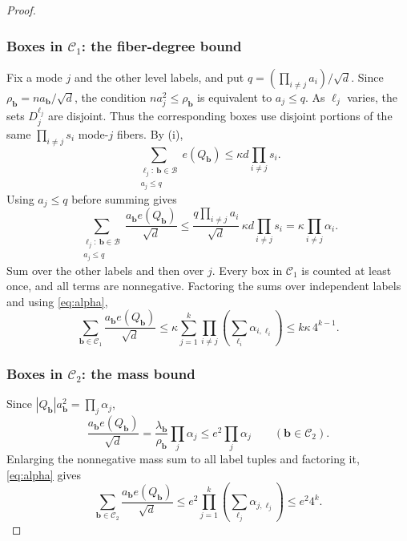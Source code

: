 \documentclass[11pt,reqno]{amsart}
\numberwithin{equation}{section}
\theoremstyle{definition}
\theoremstyle{remark}
\begin{document}
\begin{proof}
\subsubsection*{Boxes in $\mathcal C_1$: the fiber-degree bound}
Fix a mode $j$ and the other level labels, and put
$q=(\prod_{i\ne j}a_i)/\sqrt d$. Since
$\rho_{\mathbf b}=na_{\mathbf b}/\sqrt d$, the condition
$na_j^2\le\rho_{\mathbf b}$ is equivalent to $a_j\le q$.
As $\ell_j$ varies, the sets $D_j^{\ell_j}$ are disjoint.
Thus the corresponding boxes use disjoint portions of the same
$\prod_{i\ne j}s_i$ mode-$j$ fibers. By \textup{(i)},
\[
 \sum_{\substack{\ell_j:\ \mathbf b\in\mathcal B\\a_j\le q}}e(Q_{\mathbf b})
 \le\kappa d\prod_{i\ne j}s_i.
\]
Using $a_j\le q$ before summing gives
\[
 \sum_{\substack{\ell_j:\ \mathbf b\in\mathcal B\\a_j\le q}}
       \frac{a_{\mathbf b}e(Q_{\mathbf b})}{\sqrt d}
 \le\frac{q\prod_{i\ne j}a_i}{\sqrt d}\,
       \kappa d\prod_{i\ne j}s_i
 =\kappa\prod_{i\ne j}\alpha_i.
\]
Sum over the other labels and then over $j$. Every box in
$\mathcal C_1$ is counted at least once, and all terms are nonnegative.
Factoring the sums over independent labels and using \eqref{eq:alpha},
\begin{equation}\label{eq:unbalanced-sum}
 \sum_{\mathbf b\in\mathcal C_1}
       \frac{a_{\mathbf b}e(Q_{\mathbf b})}{\sqrt d}
 \le\kappa\sum_{j=1}^k
       \prod_{i\ne j}\left(\sum_{\ell_i}\alpha_{i,\ell_i}\right)
 \le k\kappa\,4^{k-1}.
\end{equation}

\subsubsection*{Boxes in $\mathcal C_2$: the mass bound}
Since $|Q_{\mathbf b}|a_{\mathbf b}^2=\prod_j\alpha_j$,
\[
 \frac{a_{\mathbf b}e(Q_{\mathbf b})}{\sqrt d}
 =\frac{\lambda_{\mathbf b}}{\rho_{\mathbf b}}\prod_j\alpha_j
 \le e^2\prod_j\alpha_j
 \qquad(\mathbf b\in\mathcal C_2).
\]
Enlarging the nonnegative mass sum to all label tuples and factoring
it, \eqref{eq:alpha} gives
\begin{equation}\label{eq:moderate-sum}
 \sum_{\mathbf b\in\mathcal C_2}
       \frac{a_{\mathbf b}e(Q_{\mathbf b})}{\sqrt d}
 \le e^2\prod_{j=1}^k\left(\sum_{\ell_j}\alpha_{j,\ell_j}\right)
 \le e^2 4^k.
\end{equation}


\end{proof}
\end{document}
